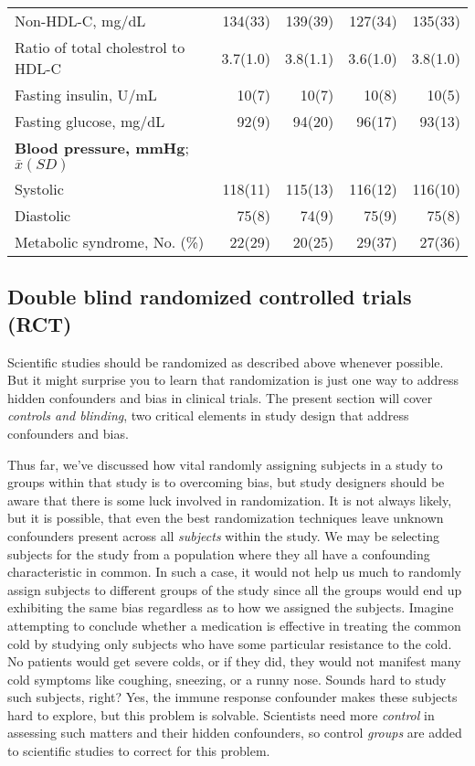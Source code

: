 \documentclass[11pt]{book}\usepackage[]{graphicx}\usepackage[]{color}
\begin{document}
\begin{table}[ht]
\begin{tabular}{@{} lrrrr @{}}
Non-HDL-C, mg/dL       & 134(33) & 139(39) & 127(34) & 135(33) \\
Ratio of total cholestrol to HDL-C & 3.7(1.0) & 3.8(1.1) & 3.6(1.0) & 3.8(1.0) \\
Fasting insulin, U/mL & 10(7) & 10(7) & 10(8) & 10(5) \\
Fasting glucose, mg/dL & 92(9) & 94(20) & 96(17) & 93(13) \\
\textbf{Blood pressure, mmHg}; $\bar{x} (SD)$ & & & & \\
Systolic & 118(11) & 115(13) & 116(12) & 116(10) \\
Diastolic & 75(8) & 74(9) & 75(9) & 75(8) \\
Metabolic syndrome, No. (\%) & 22(29) & 20(25) & 29(37) & 27(36) \\ \hline
\end{tabular}
  \label{tbl51}
\end{table}

\subsection{Double blind randomized controlled trials (RCT)}

Scientific studies should be randomized as described above whenever possible. But it might surprise you to learn that randomization is just one way to address hidden confounders and bias in clinical trials. The present section will cover \textit{controls and blinding}, two critical elements in study design that address confounders and bias.

Thus far, we’ve discussed how vital randomly assigning subjects in a study to groups within that study is to overcoming bias, but study designers should be aware that there is some luck involved in randomization. It is not always likely, but it is possible, that even the best randomization techniques leave unknown confounders present across all \textit{subjects} within the study. We may be selecting subjects for the study from a population where they all have a confounding characteristic in common. In such a case, it would not help us much to randomly assign subjects to different groups of the study since all the groups would end up exhibiting the same bias regardless as to how we assigned the subjects. Imagine attempting to conclude whether a medication is effective in treating the common cold by studying only subjects who have some particular resistance to the cold. No patients would get severe colds, or if they did, they would not manifest many cold symptoms like coughing, sneezing, or a runny nose. Sounds hard to study such subjects, right? Yes, the immune response confounder makes these subjects hard to explore, but this problem is solvable. Scientists need more \textit{control} in assessing such matters and their hidden confounders, so control \textit{groups} are added to scientific studies to correct for this problem.
\end{document}
